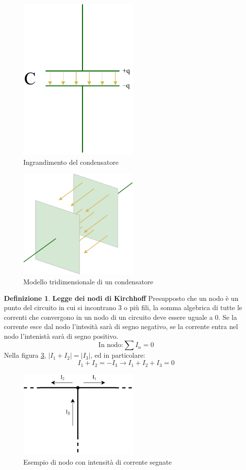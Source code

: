 \documentclass[a3paper, twoside, openany]{book}
\theoremstyle{definition}
\newtheorem{definition}{Definizione}
\begin{document}
\begin{figure}[htp]
    \centering
    \includegraphics[width=6cm]{Circuito RC-Condensatore-zoom}
    \caption{Ingrandimento del condensatore}
    \label{fig:condensatore-z}
\end{figure}
\begin{figure}[htp]
    \centering
    \includegraphics[width=6cm]{Circuito RC-Condensatore-3D}
    \caption{Modello tridimensionale di un condensatore}
    \label{fig:condensatore-3d}
\end{figure}
\begin{definition}{\textbf{Legge dei nodi di Kirchhoff}}
Presupposto che un nodo è un punto del circuito in cui si incontrano 3 o più fili, la somma algebrica di tutte le correnti che convergono in un nodo di un circuito deve essere uguale a 0. Se la corrente esce dal nodo l'intesità sarà di segno negativo, se la corrente entra nel nodo l'intenistà sarà di segno positivo. $$\text{In nodo:}\sum{I_n}=0$$ Nella figura \ref{fig:nodo}, $|I_1+I_2|=|I_3|$, ed in particolare: $$I_1+I_2=-I_3\longrightarrow I_1+I_2+I_3=0$$
\end{definition}
\begin{figure}[htp]
    \centering
    \includegraphics[width=6cm]{Circuito RC-Nodo}
    \caption{Esempio di nodo con intensità di corrente segnate}
    \label{fig:nodo}
\end{figure}
\end{document}
